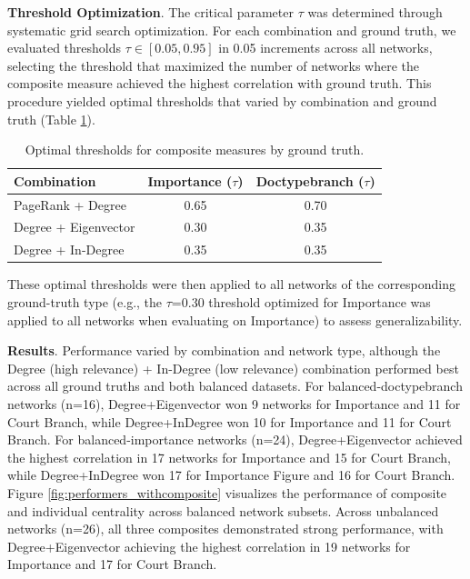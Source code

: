 \documentclass[sigconf,authordraft]{acmart}
\begin{document}
\noindent\textbf{Threshold Optimization}.
The critical parameter $\tau$ was determined through systematic grid search optimization. For each combination and ground truth, we evaluated thresholds $\tau \in [0.05, 0.95]$ in 0.05 increments across all networks, selecting the threshold that maximized the number of networks where the composite measure achieved the highest correlation with ground truth. This procedure yielded optimal thresholds that varied by combination and ground truth (Table \ref{tab:optimal_thresholds}).


\begin{table}[h!]
\centering
\begin{tabular}{lcc}
\toprule
\textbf{Combination} & \textbf{Importance ($\tau$)} & \textbf{Doctypebranch ($\tau$)} \\ \midrule
PageRank + Degree       & 0.65 & 0.70 \\
Degree + Eigenvector    & 0.30 & 0.35 \\
Degree + In-Degree      & 0.35 & 0.35 \\ \bottomrule
\end{tabular}
\caption{Optimal thresholds for composite measures by ground truth.}
\label{tab:optimal_thresholds}
\end{table}

These optimal thresholds were then applied to all networks of the corresponding ground-truth type (e.g., the $\tau$=0.30 threshold optimized for Importance was applied to all networks when evaluating on Importance) to assess generalizability.

\noindent\textbf{Results}. Performance varied by combination and network type, although the Degree (high relevance) + In-Degree (low relevance) combination performed best across all ground truths and both balanced datasets.
For balanced-doctypebranch networks (n=16), Degree+Eigenvector won 9 networks for Importance and 11 for Court Branch, while Degree+InDegree won 10 for Importance and 11 for Court Branch. For balanced-importance networks (n=24), Degree+Eigenvector achieved the highest correlation in 17 networks for Importance and 15 for Court Branch, while Degree+InDegree won 17 for Importance Figure and 16 for Court Branch.
Figure \ref{fig:performers_withcomposite} visualizes the performance of composite and individual centrality across balanced network subsets.
Across unbalanced networks (n=26), all three composites demonstrated strong performance, with Degree+Eigenvector achieving the highest correlation in 19 networks for Importance and 17 for Court Branch.
\end{document}
